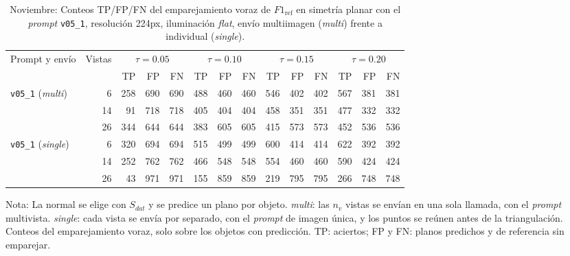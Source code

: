 \begin{table}[htbp]
\centering
\caption{Noviembre: Conteos TP/FP/FN del emparejamiento voraz de $F1_{\mathrm{ref}}$ en simetría planar con el \textit{prompt} \texttt{v05\_1}, resolución 224px, iluminación \textit{flat}, envío multiimagen (\textit{multi}) frente a individual (\textit{single}).}
\label{tab:nov_plane_modo_envio_conteos}
\begin{lrbox}{\tablebox}
\begin{adjustbox}{max width=\textwidth}
\begin{tabular}{lrrrrrrrrrrrrr}
\toprule
\multirow{2}{*}{Prompt y envío} & \multirow{2}{*}{Vistas} & \multicolumn{3}{c}{$\tau{=}0.05$} & \multicolumn{3}{c}{$\tau{=}0.10$} & \multicolumn{3}{c}{$\tau{=}0.15$} & \multicolumn{3}{c}{$\tau{=}0.20$} \\
\cmidrule(lr){3-5} \cmidrule(lr){6-8} \cmidrule(lr){9-11} \cmidrule(lr){12-14}
 &  & TP & FP & FN & TP & FP & FN & TP & FP & FN & TP & FP & FN \\
\midrule
\multirow{3}{*}{\texttt{v05\_1} (\textit{multi})} & 6 & 258 & 690 & 690 & 488 & 460 & 460 & 546 & 402 & 402 & 567 & 381 & 381 \\
 & 14 & 91 & 718 & 718 & 405 & 404 & 404 & 458 & 351 & 351 & 477 & 332 & 332 \\
 & 26 & 344 & 644 & 644 & 383 & 605 & 605 & 415 & 573 & 573 & 452 & 536 & 536 \\
\midrule
\multirow{3}{*}{\texttt{v05\_1} (\textit{single})} & 6 & 320 & 694 & 694 & 515 & 499 & 499 & 600 & 414 & 414 & 622 & 392 & 392 \\
 & 14 & 252 & 762 & 762 & 466 & 548 & 548 & 554 & 460 & 460 & 590 & 424 & 424 \\
 & 26 & 43 & 971 & 971 & 155 & 859 & 859 & 219 & 795 & 795 & 266 & 748 & 748 \\
\bottomrule
\end{tabular}
\end{adjustbox}
\end{lrbox}
\usebox{\tablebox}

\vspace{1.5ex}
\begin{minipage}{\wd\tablebox}
\footnotesize
Nota: La normal se elige con $S_{dat}$ y se predice un plano por objeto. \textit{multi}: las $n_v$ vistas se envían en una sola llamada, con el \textit{prompt} multivista. \textit{single}: cada vista se envía por separado, con el \textit{prompt} de imagen única, y los puntos se reúnen antes de la triangulación. Conteos del emparejamiento voraz, solo sobre los objetos con predicción. TP: aciertos; FP y FN: planos predichos y de referencia sin emparejar.
\end{minipage}
\end{table}

